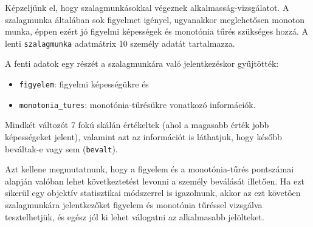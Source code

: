 \documentclass[
  letterpaper,
]{krantz}
\makeatletter
\newenvironment{Shaded}{\begin{snugshade}}{\end{snugshade}}
\newcommand{\AttributeTok}[1]{\textcolor[rgb]{0.40,0.45,0.13}{#1}}
\newcommand{\CommentTok}[1]{\textcolor[rgb]{0.37,0.37,0.37}{#1}}
\newcommand{\FunctionTok}[1]{\textcolor[rgb]{0.28,0.35,0.67}{#1}}
\newcommand{\NormalTok}[1]{\textcolor[rgb]{0.00,0.23,0.31}{#1}}
\newcommand{\OtherTok}[1]{\textcolor[rgb]{0.00,0.23,0.31}{#1}}
\newcommand{\SpecialCharTok}[1]{\textcolor[rgb]{0.37,0.37,0.37}{#1}}
\newcommand{\StringTok}[1]{\textcolor[rgb]{0.13,0.47,0.30}{#1}}
\providecommand{\tightlist}{%
  \setlength{\itemsep}{0pt}\setlength{\parskip}{0pt}}\usepackage{longtable,booktabs,array}
\newenvironment{kframe}{%
\medskip{}
\setlength{\fboxsep}{.8em}
 \def\at@end@of@kframe{}%
 \ifinner\ifhmode%
  \def\at@end@of@kframe{\end{minipage}}%
  \begin{minipage}{\columnwidth}%
 \fi\fi%
 \def\FrameCommand##1{\hskip\@totalleftmargin \hskip-\fboxsep
 \colorbox{shadecolor}{##1}\hskip-\fboxsep
     \hskip-\linewidth \hskip-\@totalleftmargin \hskip\columnwidth}%
 \MakeFramed {\advance\hsize-\width
   \@totalleftmargin\z@ \linewidth\hsize
   \@setminipage}}%
 {\par\unskip\endMakeFramed%
 \at@end@of@kframe}
\renewenvironment{Shaded}{\begin{kframe}}{\end{kframe}}
\makeatother
\begin{document}
Képzeljünk el, hogy szalagmunkásokkal végeznek alkalmasság-vizsgálatot.
A szalagmunka általában sok figyelmet igényel, ugyanakkor meglehetősen
monoton munka, éppen ezért jó figyelmi képességek és monotónia tűrés
szükséges hozzá. A lenti \texttt{szalagmunka} adatmátrix 10 személy
adatát tartalmazza.

\begin{Shaded}
\end{Shaded}

A fenti adatok egy részét a szalagmunkára való jelentkezéskor
gyűjtötték:

\begin{itemize}
\tightlist
\item
  \texttt{figyelem}: figyelmi képességükre és
\item
  \texttt{monotonia\_tures}: monotónia-tűrésükre vonatkozó információk.
\end{itemize}

Mindkét változót 7 fokú skálán értékeltek (ahol a magasabb érték jobb
képességeket jelent), valamint azt az információt is láthatjuk, hogy
később beváltak-e vagy sem (\texttt{bevalt}).

Azt kellene megmutatnunk, hogy a figyelem és a monotónia-tűrés
pontszámai alapján valóban lehet következtetést levonni a személy
beválását illetően. Ha ezt sikerül egy objektív statisztikai módszerrel
is igazolnunk, akkor az ezt követően szalagmunkára jelentkezőket
figyelem és monotónia tűréssel vizsgálva tesztelhetjük, és egész jól ki
lehet válogatni az alkalmasabb jelölteket.
\end{document}
